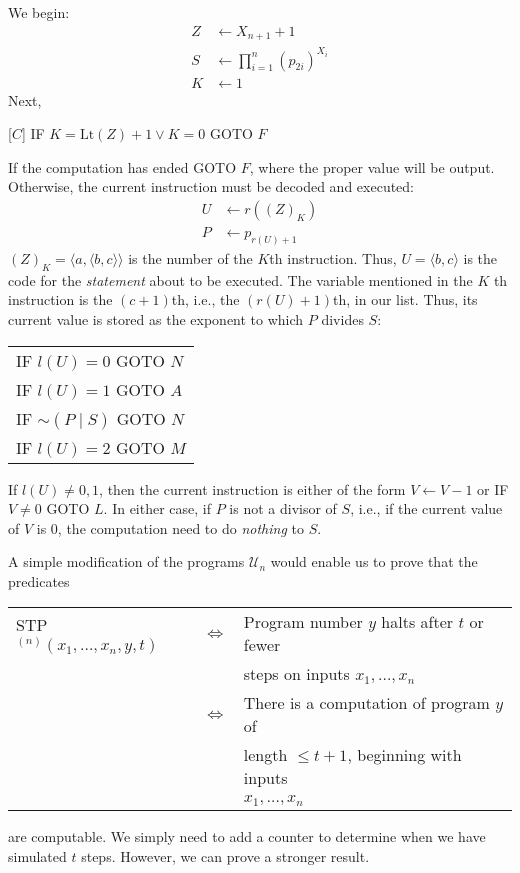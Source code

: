 \documentclass[12pt,a4paper,twoside,openany]{book}
\begin{document}
We begin:
\begin{equation*}
    \begin{aligned}Z &\leftarrow X_{n+1} + 1 \\S &\leftarrow \prod_{i=1}^n (p_{2i})^{X_i}\\K &\leftarrow 1\end{aligned}
\end{equation*}
Next,
\begin{center}
    [$C$]  IF $K=\text{Lt}(Z)+1\lor K=0\text{ GOTO }F$
\end{center}
If the computation has ended GOTO $F$, where the proper value will be output. Otherwise, the current instruction must be decoded and executed:
\begin{equation*}
    \begin{aligned}U&\leftarrow r((Z)_K)\\P&\leftarrow p_{r(U)+1}\end{aligned}
\end{equation*}
$(Z)_K=\langle a,\langle b,c\rangle\rangle$ is the number of the $K$th instruction. Thus, $U=\langle b,c\rangle$ is the code for the \textit{statement} about to be executed. The variable mentioned in the $K$ th instruction is the $(c+1)$th, i.e., the $(r(U)+1)$th, in our list. Thus, its current value is stored as the exponent to which $P$ divides $S$:
\begin{center}
    \begin{tabular}{l}
        IF $l(U)=0$ GOTO $N$\\
        IF $l(U)=1$ GOTO $A$\\
        IF $\sim(P\mid S)$ GOTO $N$\\
        IF $l(U)=2$ GOTO $M$
    \end{tabular}
\end{center}
If $l(U)\ne 0,1$, then the current instruction is either of the form $V\leftarrow V-1$ or IF $V\ne 0$ GOTO $L$. In either case, if $P$ is not a divisor of $S$, i.e., if the current value of $V$ is 0, the computation need to do \textit{nothing} to $S$.

A simple modification of the programs $\mathscr{U}_n$ would enable us to prove that the predicates
\begin{center}
    \begin{tabular}{lll}
        STP$^{(n)}(x_1,\ldots,x_n,y,t)$ & $\Leftrightarrow$ & Program number $y$ halts after $t$ or fewer\\ 
        && steps on inputs $x_1,\ldots,x_n$\\
        & $\Leftrightarrow$ & There is a computation of program $y$ of\\
        && length $\le t+1$, beginning with inputs\\
        && $x_1,\ldots,x_n$
    \end{tabular}
\end{center}
are computable. We simply need to add a counter to determine when we have simulated $t$ steps. However, we can prove a stronger result.
\end{document}
